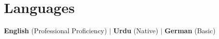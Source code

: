 
\section{Languages}
\vspace{2pt}
\small{
\textbf{English} (Professional Proficiency) $|$ \textbf{Urdu} (Native) $|$ \textbf{German} (Basic)
}
